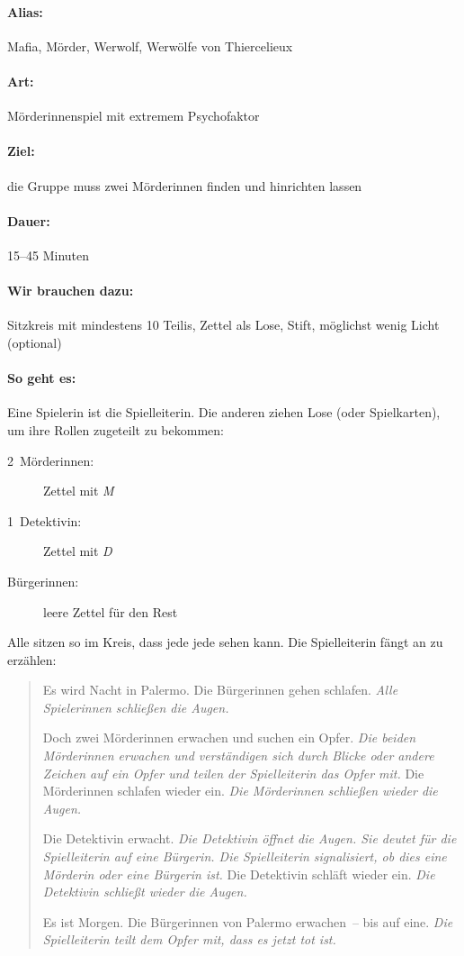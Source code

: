 \paragraph{Alias:} Mafia, Mörder, Werwolf, Werwölfe von Thiercelieux
\paragraph{Art:} Mörderinnenspiel mit extremem Psychofaktor
\paragraph{Ziel:} die Gruppe muss zwei Mörderinnen finden und hinrichten lassen
\paragraph{Dauer:} 15--45 Minuten
\paragraph{Wir brauchen dazu:} Sitzkreis mit mindestens 10 Teilis, Zettel als Lose, Stift, möglichst wenig Licht (optional)
\paragraph{So geht es:} Eine Spielerin ist die Spielleiterin. Die anderen ziehen Lose (oder Spielkarten), um ihre Rollen zugeteilt zu bekommen:
\begin{description}
  \item [2~Mörderinnen:] Zettel mit \emph{M}
  \item [1~Detektivin:] Zettel mit \emph{D}
  \item [Bürgerinnen:] leere Zettel für den Rest
\end{description}

Alle sitzen so im Kreis, dass jede jede sehen kann. Die Spielleiterin fängt an zu erzählen:
\begin{quotation}
  Es wird Nacht in Palermo. Die Bürgerinnen gehen schlafen. \emph{Alle Spielerinnen schließen die Augen.}

  Doch zwei Mörderinnen erwachen und suchen ein Opfer. \emph{Die beiden Mörderinnen erwachen und verständigen sich durch Blicke oder andere Zeichen auf ein Opfer und teilen der Spielleiterin das Opfer mit.} Die Mörderinnen schlafen wieder ein. \emph{Die Mörderinnen schließen wieder die Augen.}

  Die Detektivin erwacht. \emph{Die Detektivin öffnet die Augen. Sie deutet für die Spielleiterin auf eine Bürgerin. Die Spielleiterin signalisiert, ob dies eine Mörderin oder eine Bürgerin ist.} Die Detektivin schläft wieder ein. \emph{Die Detektivin schließt wieder die Augen.}

  Es ist Morgen. Die Bürgerinnen von Palermo erwachen~-- bis auf eine. \emph{Die Spielleiterin teilt dem Opfer mit, dass es jetzt tot ist.}
\end{quotation}

